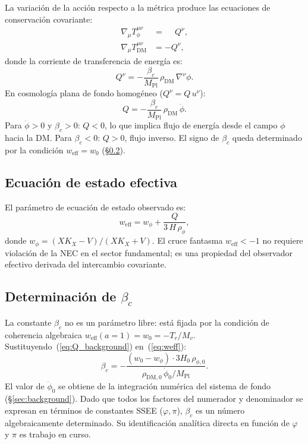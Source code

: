 \documentclass[11pt,a4paper]{article}
\newcommand{\phiG}{\varphi}          %
\newcommand{\Mpl}{M_{\mathrm{Pl}}}
\newcommand{\weff}{w_{\mathrm{eff}}}
\newcommand{\wphi}{w_\phi}
\begin{document}
La variación de la acción respecto a la métrica produce las ecuaciones de
conservación covariante:
%
\begin{align}
  \nabla_\mu T^{\mu\nu}_{\phi}  &= \phantom{-}Q^{\nu}, \label{eq:consDE}\\
  \nabla_\mu T^{\mu\nu}_{\mathrm{DM}} &= -Q^{\nu}, \label{eq:consDM}
\end{align}
%
donde la corriente de transferencia de energía es:
%
\begin{equation}
  Q^{\nu} = -\frac{\beta_c}{\Mpl}\,\rho_{\mathrm{DM}}\,\nabla^{\nu}\phi.
  \label{eq:Qnu}
\end{equation}
%
En cosmología plana de fondo homogéneo ($Q^\nu = Q\,u^\nu$):
%
\begin{equation}
  Q = -\frac{\beta_c}{\Mpl}\,\rho_{\mathrm{DM}}\,\dot\phi.
  \label{eq:Q_background}
\end{equation}
%
Para $\dot\phi > 0$ y $\beta_c > 0$: $Q < 0$, lo que implica flujo de
energía desde el campo $\phi$ hacia la DM.  Para $\beta_c < 0$: $Q > 0$,
flujo inverso.  El signo de $\beta_c$ queda determinado por la condición
$\weff = w_0$ (§\ref{sec:bc}).

\subsection{Ecuación de estado efectiva}

El parámetro de ecuación de estado observado es:
%
\begin{equation}
  \weff = \wphi + \frac{Q}{3\,H\,\rho_\phi},
  \label{eq:weff}
\end{equation}
%
donde $\wphi = (X K_X - V)/(X K_X + V)$.
El cruce fantasma $\weff < -1$ no requiere violación de la NEC en el
sector fundamental; es una propiedad del observador efectivo derivada del
intercambio covariante.

\subsection{Determinación de \texorpdfstring{$\beta_c$}{beta\_c}}
\label{sec:bc}

La constante $\beta_c$ no es un parámetro libre: está fijada por la
condición de coherencia algebraica $\weff(a{=}1) = w_0 = -T_r/M_v$.
Sustituyendo~(\ref{eq:Q_background}) en~(\ref{eq:weff}):
%
\begin{equation}
  \beta_c = -\frac{(w_0 - \wphi)\cdot 3H_0\,\rho_{\phi,0}}
              {\rho_{\mathrm{DM},0}\,\dot\phi_0 / \Mpl}.
  \label{eq:bc_constraint}
\end{equation}
%
El valor de $\dot\phi_0$ se obtiene de la integración numérica del sistema
de fondo (§\ref{sec:background}).  Dado que todos los factores del
numerador y denominador se expresan en términos de constantes SSEE
($\phiG,\pi$), $\beta_c$ es un número algebraicamente determinado.
Su identificación analítica directa en función de $\phiG$ y $\pi$ es trabajo
en curso.
\end{document}

